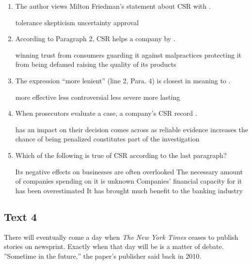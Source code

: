 \begin{enumerate}[resume]
	\item
The author views Milton Friedman's statement about CSR
with \lineread.


\fourchoices
{tolerance}
{skepticism}
{uncertainty}
{approval}



\item
According to Paragraph 2, CSR helps a company by \lineread.


\fourchoices
{winning trust from consumers}
{guarding it against malpractices}
{protecting it from being defamed}
{raising the quality of its products}


\item
The expression ``more lenient'' (line 2, Para. 4) is
closest in meaning to \lineread.


\fourchoices
{more effective}
{less controversial}
{less severe}
{more lasting}


\item
 When prosecutors evaluate a case, a company's CSR
record \lineread.


\fourchoices
{has an impact on their decision}
{comes across as reliable evidence}
{increases the chance of being penalized}
{constitutes part of the investigation}


\item
Which of the following is true of CSR according to the
last paragraph?


\fourchoices
{Its negative effects on businesses are often overlooked}
{The necessary amount of companies spending on it is unknown}
{Companies' financial capacity for it has been overestimated}
{It has brought much benefit to the banking industry}


\end{enumerate}



\newpage
\subsection{Text 4}


There will eventually come a day when \emph{The New York Times} ceases to
publish stories on newsprint. Exactly when that day will be is a matter
of debate. ''Sometime in the future,'' the paper's publisher said back
in 2010.

